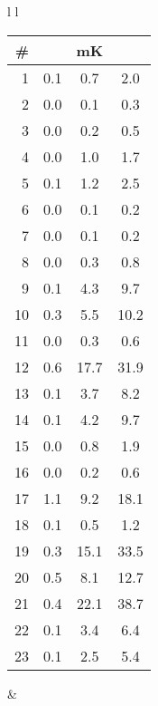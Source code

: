 \begin{figure}[h]
\begin{centering}
\begin{tabular}{l l}

\hspace{-.1in}
\begin{minipage}{2.7in}
\begin{tabular}{| r | c | c | c | } %
  \hline 
  \thinspace \thinspace \# & \thinspace \leantap  \thinspace &
  mK\leantap \thinspace & \thinspace \alphatap
  \thinspace %
  \\
  \hline
1 & 0.1 & 0.7 & 2.0 \\ 
2 & 0.0 & 0.1 & 0.3 \\ 
3 & 0.0 & 0.2 & 0.5 \\ 
4 & 0.0 & 1.0 & 1.7 \\ 
5 & 0.1 & 1.2 & 2.5 \\ 
6 & 0.0 & 0.1 & 0.2 \\ 
7 & 0.0 & 0.1 & 0.2 \\ 
8 & 0.0 & 0.3 & 0.8 \\ 
9 & 0.1 & 4.3 & 9.7 \\ 
10 & 0.3 & 5.5 & 10.2 \\ 
11 & 0.0 & 0.3 & 0.6 \\ 
12 & 0.6 & 17.7 & 31.9 \\ 
13 & 0.1 & 3.7 & 8.2 \\ 
14 & 0.1 & 4.2 & 9.7 \\ 
15 & 0.0 & 0.8 & 1.9 \\ 
16 & 0.0 & 0.2 & 0.6 \\ 
17 & 1.1 & 9.2 & 18.1 \\ 
18 & 0.1 & 0.5 & 1.2 \\ 
19 & 0.3 & 15.1 & 33.5 \\ 
20 & 0.5 & 8.1 & 12.7 \\ 
21 & 0.4 & 22.1 & 38.7 \\ 
22 & 0.1 & 3.4 & 6.4 \\ 
23 & 0.1 & 2.5 & 5.4 \\ 

  \hline
\end{tabular}

\end{minipage}

&


\end{tabular}
\end{centering}
\end{figure}
